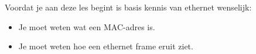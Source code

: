 Voordat je aan deze les begint is basis kennis van ethernet wenselijk:
\begin{itemize}
\item Je moet weten wat een MAC-adres is.
\item Je moet weten hoe een ethernet frame eruit ziet.
\end{itemize}
